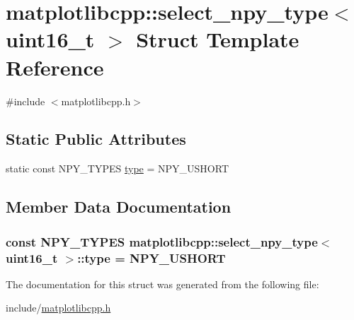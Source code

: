 \hypertarget{structmatplotlibcpp_1_1select__npy__type_3_01uint16__t_01_4}{}\section{matplotlibcpp\+:\+:select\+\_\+npy\+\_\+type$<$ uint16\+\_\+t $>$ Struct Template Reference}
\label{structmatplotlibcpp_1_1select__npy__type_3_01uint16__t_01_4}


{\ttfamily \#include $<$matplotlibcpp.\+h$>$}

\subsection*{Static Public Attributes}
\begin{DoxyCompactItemize}
\item 
static const N\+P\+Y\+\_\+\+T\+Y\+P\+ES \hyperlink{structmatplotlibcpp_1_1select__npy__type_3_01uint16__t_01_4_aca209b33cc0bcaad16c01bff097a075f}{type} = N\+P\+Y\+\_\+\+U\+S\+H\+O\+RT
\end{DoxyCompactItemize}


\subsection{Member Data Documentation}
\subsubsection[{\texorpdfstring{type}{type}}]{\setlength{\rightskip}{0pt plus 5cm}const N\+P\+Y\+\_\+\+T\+Y\+P\+ES {\bf matplotlibcpp\+::select\+\_\+npy\+\_\+type}$<$ uint16\+\_\+t $>$\+::type = N\+P\+Y\+\_\+\+U\+S\+H\+O\+RT\hspace{0.3cm}{\ttfamily [static]}}\hypertarget{structmatplotlibcpp_1_1select__npy__type_3_01uint16__t_01_4_aca209b33cc0bcaad16c01bff097a075f}{}\label{structmatplotlibcpp_1_1select__npy__type_3_01uint16__t_01_4_aca209b33cc0bcaad16c01bff097a075f}


The documentation for this struct was generated from the following file\+:\begin{DoxyCompactItemize}
\item 
include/\hyperlink{matplotlibcpp_8h}{matplotlibcpp.\+h}\end{DoxyCompactItemize}
